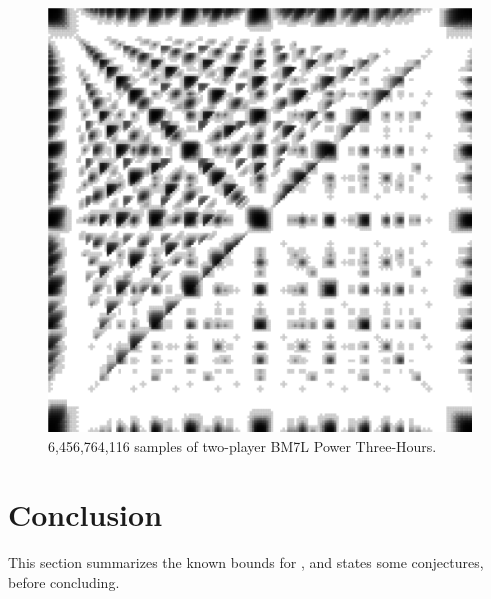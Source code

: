 \documentclass[twocolumn]{article}
\begin{document}
\begin{figure}
\begin{center}
\includegraphics[width=0.90 \linewidth]{sample180min2players7states.png}
\end{center}\vspace{-0.1in}
\caption{6,456,764,116 samples of two-player BM7L Power Three-Hours.
}
\label{fig:powerthreehours}
\end{figure}


\section{Conclusion}

This section summarizes the known bounds for \bmsl, and states some
conjectures, before concluding.
\end{document}
